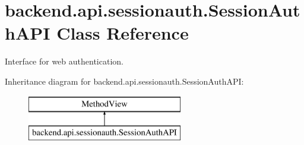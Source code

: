 \hypertarget{classbackend_1_1api_1_1sessionauth_1_1_session_auth_a_p_i}{}\section{backend.\+api.\+sessionauth.\+Session\+Auth\+A\+P\+I Class Reference}
\label{classbackend_1_1api_1_1sessionauth_1_1_session_auth_a_p_i}


Interface for web authentication.  


Inheritance diagram for backend.\+api.\+sessionauth.\+Session\+Auth\+A\+P\+I\+:\begin{figure}[H]
\begin{center}
\leavevmode
\includegraphics[height=2.000000cm]{classbackend_1_1api_1_1sessionauth_1_1_session_auth_a_p_i}
\end{center}
\end{figure}
